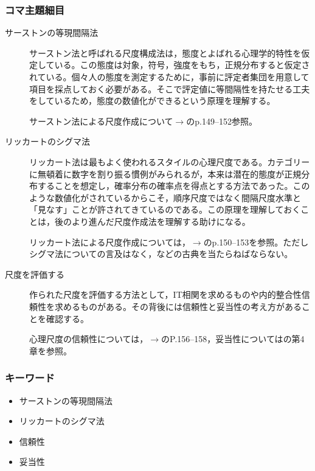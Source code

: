 \subsubsection{コマ主題細目}
\begin{description}
    \item[サーストンの等現間隔法]サーストン法と呼ばれる尺度構成法は，態度とよばれる心理学的特性を仮定している。この態度は対象，符号，強度をもち，正規分布すると仮定されている。個々人の態度を測定するために，事前に評定者集団を用意して項目を採点しておく必要がある。そこで評定値に等間隔性を持たせる工夫をしているため，態度の数値化ができるという原理を理解する。
    \begin{flushright}
        サーストン法による尺度作成について$\to$\citet{末永俊郎1987}のp.149--152参照。
    \end{flushright}
    
    \item[リッカートのシグマ法]リッカート法は最もよく使われるスタイルの心理尺度である。カテゴリーに無頓着に数字を割り振る慣例がみられるが，本来は潜在的態度が正規分布することを想定し，確率分布の確率点を得点とする方法であった。このような数値化がされているからこそ，順序尺度ではなく間隔尺度水準と「見なす」ことが許されてきているのである。この原理を理解しておくことは，後のより進んだ尺度作成法を理解する助けになる。
    
    \begin{flushright}
        リッカート法による尺度作成については，$\to$\citet{宮谷真人2009-03-02}のp.150--153を参照。ただしシグマ法についての言及はなく，\citet{田中良久1977-01T}などの古典を当たらねばならない。
    \end{flushright}
    
    \item[尺度を評価する] 作られた尺度を評価する方法として，IT相関を求めるものや内的整合性信頼性を求めるものがある。その背後には信頼性と妥当性の考え方があることを確認する。
    
    \begin{flushright}
        心理尺度の信頼性については，$\to$\citet{末永俊郎1987}のP.156--158，妥当性については\citet{kosugi2016b}の第4章を参照。
    \end{flushright}

\end{description}
\subsubsection{キーワード}
\begin{itemize}
\item サーストンの等現間隔法
\item リッカートのシグマ法
\item 信頼性
\item 妥当性
\end{itemize}
